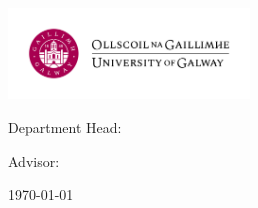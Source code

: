 \pagestyle{empty}
\begin{center}

\centerline{\mbox{\includegraphics[width=64mm]{assets/Logo_UoG.pdf}}}

\bigskip

{\large \ThesisUniversity}

{\ThesisDept}

Department Head: {\ThesisDeptHead}

\vfill

{\bfseries\Huge \ThesisTitle}

\medskip

{\Large \ThesisType}

\vspace{2cm}

{\bfseries\large \ThesisAuthor}

\medskip

{\large Advisor: \ThesisAdvisor}

\vspace{2cm}

{\large \ThesisPurpose}

\medskip

{\large \ThesisDegree}

\vspace{2cm}

\today
{}

\end{center}

\cleardoublepage

\pagestyle{fancy}
